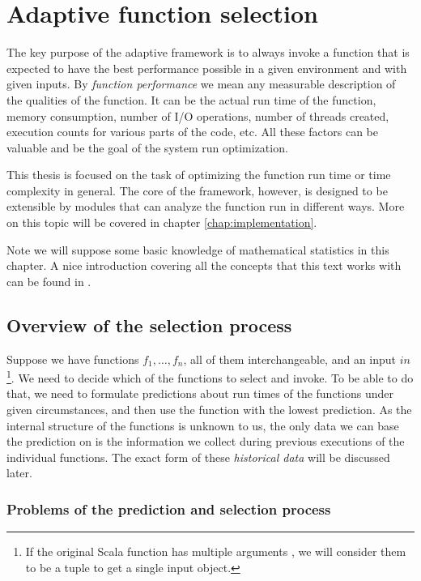\chapter{Adaptive function selection}
\label{chap:deciding}

The key purpose of the adaptive framework is to always invoke a function that is expected to have the best performance possible in a given environment and with given inputs. By \textit{function performance} we mean any measurable description of the qualities of the function. It can be the actual run time of the function, memory consumption, number of I/O operations, number of threads created, execution counts for various parts of the code, etc. All these factors can be valuable and be the goal of the system run optimization.

This thesis is focused on the task of optimizing the function run time or time complexity in general. The core of the framework, however, is designed to be extensible by modules that can analyze the function run in different ways. More on this topic will be covered in chapter \ref{chap:implementation}.

Note we will suppose some basic knowledge of mathematical statistics in this chapter. A nice introduction covering all the concepts that this text works with can be found in \cite{weiss_introductory_2010}.

\section{Overview of the selection process}
\label{sec:selection_overview}

Suppose we have functions $f_1,\dots, f_n$, all of them interchangeable, and an input $in$\footnote{If the original Scala function has multiple arguments , we will consider them to be a tuple  to get a single input object.}. We need to decide which of the functions to select and invoke. To be able to do that, we need to formulate predictions about run times of the functions under given circumstances, and then use the function with the lowest prediction. As the internal structure of the functions is unknown to us, the only data we can base the prediction on is the information we collect during previous executions of the individual functions. The exact form of these \textit{historical data} will be discussed later.

\subsection{Problems of the prediction and selection process}

